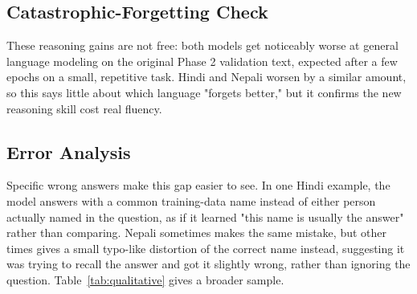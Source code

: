\documentclass[11pt]{article}
\begin{document}
\subsection{Catastrophic-Forgetting Check}

These reasoning gains are not free: both models get noticeably worse at general language modeling on the original Phase 2 validation text, expected after a few epochs on a small, repetitive task. Hindi and Nepali worsen by a similar amount, so this says little about which language "forgets better," but it confirms the new reasoning skill cost real fluency.

\subsection{Error Analysis}

Specific wrong answers make this gap easier to see. In one Hindi example, the model answers with a common training-data name instead of either person actually named in the question, as if it learned "this name is usually the answer" rather than comparing. Nepali sometimes makes the same mistake, but other times gives a small typo-like distortion of the correct name instead, suggesting it was trying to recall the answer and got it slightly wrong, rather than ignoring the question. Table~\ref{tab:qualitative} gives a broader sample.
\end{document}
